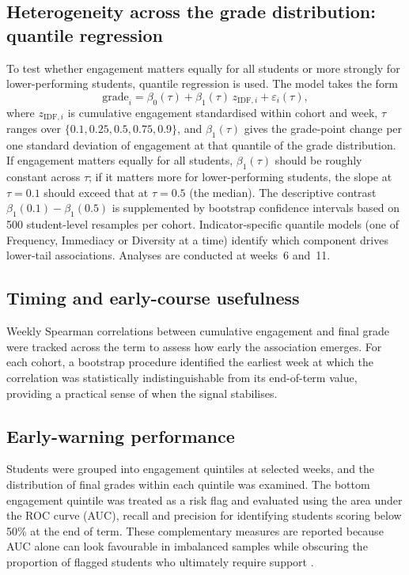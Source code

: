 \documentclass[11pt,a4paper]{article}
\begin{document}
\subsection{Heterogeneity across the grade distribution: quantile regression}
To test whether engagement matters equally for all students or more strongly for
lower-performing students, quantile regression \citep{koenker1978} is used. The
model takes the form
\[
  \mathrm{grade}_i = \beta_0(\tau) + \beta_1(\tau)\,z_{\mathrm{IDF},i} +
  \varepsilon_i(\tau),
\]
where $z_{\mathrm{IDF},i}$ is cumulative engagement standardised within cohort
and week, $\tau$ ranges over $\{0.1, 0.25, 0.5, 0.75, 0.9\}$, and
$\beta_1(\tau)$ gives the grade-point change per one standard deviation of
engagement at that quantile of the grade distribution. If engagement matters
equally for all students, $\beta_1(\tau)$ should be roughly constant across
$\tau$; if it matters more for lower-performing students, the slope at $\tau=0.1$
should exceed that at $\tau=0.5$ (the median). The descriptive contrast
$\beta_1(0.1) - \beta_1(0.5)$ is supplemented by bootstrap confidence intervals
based on 500 student-level resamples per cohort. Indicator-specific quantile
models (one of Frequency, Immediacy or Diversity at a time) identify which
component drives lower-tail associations. Analyses are conducted at weeks~6
and~11.

\subsection{Timing and early-course usefulness}
Weekly Spearman correlations between cumulative engagement and final grade were
tracked across the term to assess how early the association emerges. For each
cohort, a bootstrap procedure identified the earliest week at which the
correlation was statistically indistinguishable from its end-of-term value,
providing a practical sense of when the signal stabilises.

\subsection{Early-warning performance}
Students were grouped into engagement quintiles at selected weeks, and the
distribution of final grades within each quintile was examined. The bottom
engagement quintile was treated as a risk flag and evaluated using the area under
the ROC curve (AUC), recall and precision for identifying students scoring below
50\% at the end of term. These complementary measures are reported because AUC
alone can look favourable in imbalanced samples while obscuring the proportion of
flagged students who ultimately require support \citep{conijn2017,johnston2025}.
\end{document}

